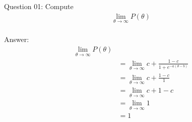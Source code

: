 \documentclass[10pt,a4paper]{article}
\author{Daniel Frederico Lins Leite}
\begin{document}
	Question 01:
	Compute\\
	\begin{align*}
		\lim_{\theta \to \infty} P(\theta)
	\end{align*}
	\\
	Answer:
	\begin{align*}
		\lim_{\theta \to \infty} P(\theta)\\
		&=\lim_{\theta \to \infty} {c + \frac{1-c}{1+e^{-a(\theta - b)}}}\\
		&=\lim_{\theta \to \infty} {c + \frac{1-c}{1}}\\
		&=\lim_{\theta \to \infty} {c + 1 -c}\\
		&=\lim_{\theta \to \infty} {1}\\
		&=1
	\end{align*}
\end{document}
